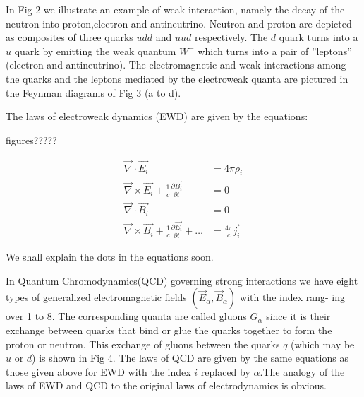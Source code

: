 In Fig 2 we illustrate an example of weak interaction, namely the decay of the
neutron into proton,electron and antineutrino. Neutron and proton are depicted as
composites of three quarks $udd$ and $uud$ respectively. The $d$ quark turns into a
$u$ quark by emitting the weak quantum $W^{-}$ which turns into a pair of ”leptons”
(electron and antineutrino). The electromagnetic and weak interactions among
the quarks and the leptons mediated by the electroweak quanta are pictured in the
Feynman diagrams of Fig 3 (a to d).


The laws of electroweak dynamics (EWD) are given by the equations:

figures?????

\begin{align}
\vec{\nabla} \cdot \vec{E_{i}} &= 4 \pi \rho_{i}\\
\vec{\nabla} \times \vec{E_{i}} + \frac{1}{c} \frac{\partial \vec{B_{i}}}{\partial t} &=0\\
\vec{\nabla} \cdot \vec{B_{i}} &= 0\\
\vec{\nabla} \times \vec{B_{i}} + \frac{1}{c} \frac{\partial \vec{E_{i}}}{\partial t}+ \ldots &= \frac{4\pi}{c} \vec{j_{i}}
\end{align}

We shall explain the dots in the equations soon.


In Quantum Chromodynamics(QCD) governing strong interactions we have
eight types of generalized electromagnetic fields $(\vec{E}_{\alpha} , \vec{B}_{\alpha})$ with the index  rang-
ing over 1 to 8. The corresponding quanta are called gluons $G_{\alpha}$ since it is their
exchange between quarks that bind or glue the quarks together to form the proton
or neutron. This exchange of gluons between the quarks $q$ (which may be $u$ or
$d$) is shown in Fig 4. The laws of QCD are given by the same equations as those
given above for EWD with the index $i$ replaced by $\alpha$.The analogy of the laws of
EWD and QCD to the original laws of electrodynamics is obvious.



